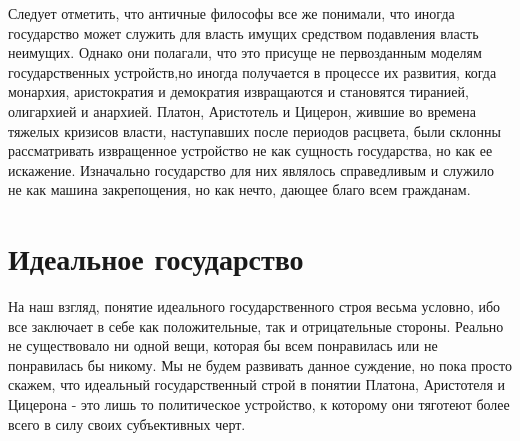 	Следует отметить, что античные философы все же понимали, что иногда 
	государство может служить для власть имущих средством подавления власть 
	неимущих. Однако они полагали, что это присуще не первозданным моделям 
	государственных устройств,но иногда получается в процессе их развития, 
	когда монархия, аристократия и демократия извращаются и становятся 
	тиранией, олигархией и анархией. Платон, Аристотель и Цицерон, жившие 
	во времена тяжелых кризисов власти, наступавших после периодов расцвета, 
	были склонны рассматривать извращенное устройство не как сущность 
	государства, но как ее искажение. Изначально государство для них являлось 
	справедливым и служило не как машина закрепощения, но как нечто, дающее 
	благо всем гражданам.

\chapter{Идеальное государство}

	На наш взгляд, понятие идеального государственного строя весьма условно, 
	ибо все заключает в себе как положительные, так и отрицательные стороны. 
	Реально не существовало ни одной вещи, которая бы всем понравилась или не 
	понравилась бы никому. Мы не будем развивать данное суждение, но пока 
	просто скажем, что идеальный государственный строй в понятии Платона, 
	Аристотеля и Цицерона - это лишь то политическое устройство, к которому 
	они тяготеют более всего в силу своих субъективных черт.

